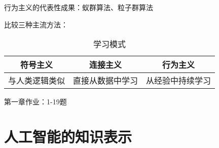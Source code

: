 \begin{notation}
    行为主义的代表性成果：蚁群算法、粒子群算法
\end{notation}
比较三种主流方法：

\begin{table}[htpb]
    \centering
    \caption{学习模式}
    \label{tab:学习模式}
    \begin{tabular}{ccc}
    \toprule
    符号主义 & 连接主义 & 行为主义\\
    \midrule
    与人类逻辑类似 & 直接从数据中学习 & 从经验中持续学习\\
    \bottomrule
    \end{tabular}
\end{table}

第一章作业：1-19题
\section{人工智能的知识表示}%
\label{sec:人工智能的知识表示}
